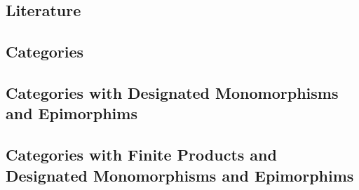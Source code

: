 \subsection{Literature}

\fi
\subsection{Categories}


\subsection{Categories with Designated Monomorphisms and Epimorphims}



\subsection{Categories with Finite Products and Designated Monomorphisms and Epimorphims}


\iffalse
\subsection{Entity-Relationship Notation}


\subsection{Unused}

\fi

\iffalse
\begin{frame}{Bibliography}

\end{frame}
\fi

